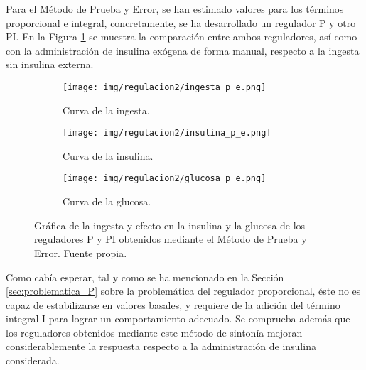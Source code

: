 Para el Método de Prueba y Error, se han estimado valores para los términos proporcional e integral, concretamente, se ha desarrollado un regulador P y otro PI. En la Figura \ref{fig:prueba_error} se muestra la comparación entre ambos reguladores, así como con la administración de insulina exógena de forma manual, respecto a la ingesta sin insulina externa. 
\clearpage
\begin{figure}[htbp]
    \centering
    \begin{subfigure}[b]{0.9\linewidth} %
        \centering
        \texttt{[image: img/regulacion2/ingesta\_p\_e.png]}
        \caption{Curva de la ingesta.}
    \end{subfigure}
    
    \vspace{0.5cm} %

    \begin{subfigure}[b]{0.9\linewidth} %
        \centering
        \texttt{[image: img/regulacion2/insulina\_p\_e.png]}
        \caption{Curva de la insulina.}
    \end{subfigure}
    
    \vspace{0.5cm} %

    \begin{subfigure}[b]{0.9\linewidth} %
        \centering
        \texttt{[image: img/regulacion2/glucosa\_p\_e.png]}
        \caption{Curva de la glucosa.}
    \end{subfigure}
    
    \caption{Gráfica de la ingesta y efecto en la insulina y la glucosa de los reguladores P y PI obtenidos mediante el Método de Prueba y Error. Fuente propia.}
    \label{fig:prueba_error}
\end{figure}

\clearpage
Como cabía esperar, tal y como se ha mencionado en la Sección \ref{sec:problematica_P} sobre la problemática del regulador proporcional, éste no es capaz de estabilizarse en valores basales, y requiere de la adición del término integral I para lograr un comportamiento adecuado. Se comprueba además que los reguladores obtenidos mediante este método de sintonía mejoran considerablemente la respuesta respecto a la administración de insulina considerada.


